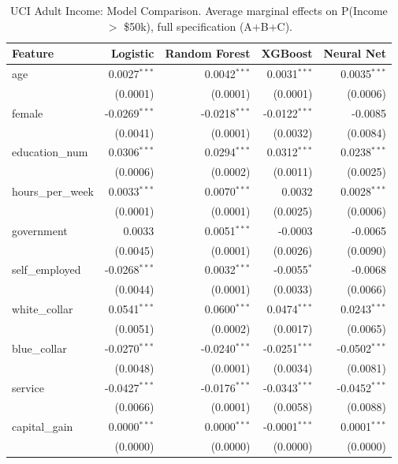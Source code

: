 \documentclass[12pt]{article}
\begin{document}
	\begin{table}[htbp]
		\centering
		\small
		\begin{threeparttable}
			\caption{UCI Adult Income: Model Comparison. Average marginal effects on P(Income $>$ \$50k), full specification (A+B+C).}
			\label{tab:adult_model_comparison}
			\begin{tabular}{lrrrr}
				\toprule
				Feature & Logistic & Random Forest & XGBoost & Neural Net \\
				\midrule
				age & 0.0027$^{***}$ & 0.0042$^{***}$ & 0.0031$^{***}$ & 0.0035$^{***}$ \\
				& (0.0001) & (0.0001) & (0.0001) & (0.0006) \\
				female & -0.0269$^{***}$ & -0.0218$^{***}$ & -0.0122$^{***}$ & -0.0085 \\
				& (0.0041) & (0.0001) & (0.0032) & (0.0084) \\
				education\_num & 0.0306$^{***}$ & 0.0294$^{***}$ & 0.0312$^{***}$ & 0.0238$^{***}$ \\
				& (0.0006) & (0.0002) & (0.0011) & (0.0025) \\
				\midrule
				hours\_per\_week & 0.0033$^{***}$ & 0.0070$^{***}$ & 0.0032 & 0.0028$^{***}$ \\
				& (0.0001) & (0.0001) & (0.0025) & (0.0006) \\
				government & 0.0033 & 0.0051$^{***}$ & -0.0003 & -0.0065 \\
				& (0.0045) & (0.0001) & (0.0026) & (0.0090) \\
				self\_employed & -0.0268$^{***}$ & 0.0032$^{***}$ & -0.0055$^{*}$ & -0.0068 \\
				& (0.0044) & (0.0001) & (0.0033) & (0.0066) \\
				white\_collar & 0.0541$^{***}$ & 0.0600$^{***}$ & 0.0474$^{***}$ & 0.0243$^{***}$ \\
				& (0.0051) & (0.0002) & (0.0017) & (0.0065) \\
				blue\_collar & -0.0270$^{***}$ & -0.0240$^{***}$ & -0.0251$^{***}$ & -0.0502$^{***}$ \\
				& (0.0048) & (0.0001) & (0.0034) & (0.0081) \\
				service & -0.0427$^{***}$ & -0.0176$^{***}$ & -0.0343$^{***}$ & -0.0452$^{***}$ \\
				& (0.0066) & (0.0001) & (0.0058) & (0.0088) \\
				\midrule
				capital\_gain & 0.0000$^{***}$ & 0.0000$^{***}$ & -0.0001$^{***}$ & 0.0001$^{***}$ \\
				& (0.0000) & (0.0000) & (0.0000) & (0.0000) \\

\end{tabular}
\end{threeparttable}
\end{table}
\end{document}
